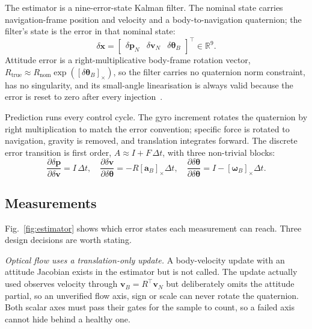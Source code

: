 \documentclass[conference]{IEEEtran}
\begin{document}
The estimator is a nine-error-state Kalman filter. The nominal state carries
navigation-frame position and velocity and a body-to-navigation quaternion;
the filter's state is the error in that nominal state:
\begin{equation}
\delta\mathbf{x} =
\begin{bmatrix} \delta\mathbf{p}_N & \delta\mathbf{v}_N & \delta\boldsymbol{\theta}_B \end{bmatrix}^{\!\top}
\in \mathbb{R}^{9}.
\end{equation}
Attitude error is a right-multiplicative body-frame rotation vector,
$R_{\text{true}} \approx R_{\text{nom}}\exp([\delta\boldsymbol{\theta}_B]_\times)$,
so the filter carries no quaternion norm constraint, has no singularity, and
its small-angle linearisation is always valid because the error is reset to
zero after every injection~\cite{sola2017}.

Prediction runs every control cycle. The gyro increment rotates the quaternion
by right multiplication to match the error convention; specific force is
rotated to navigation, gravity is removed, and translation integrates forward.
The discrete error transition is first order, $A \approx I + F\,\Delta t$, with
three non-trivial blocks:
\begin{equation}
\frac{\partial \delta\mathbf{p}}{\partial \delta\mathbf{v}} = I\,\Delta t,
\quad
\frac{\partial \delta\mathbf{v}}{\partial \delta\boldsymbol{\theta}} = -R[\mathbf{a}_B]_\times \Delta t,
\quad
\frac{\partial \delta\boldsymbol{\theta}}{\partial \delta\boldsymbol{\theta}} = I - [\boldsymbol{\omega}_B]_\times \Delta t.
\end{equation}

\subsection{Measurements}

Fig.~\ref{fig:estimator} shows which error states each measurement can reach.
Three design decisions are worth stating.

\emph{Optical flow uses a translation-only update.} A body-velocity update
with an attitude Jacobian exists in the estimator but is not called. The
update actually used observes velocity through $\mathbf{v}_B = R^\top
\mathbf{v}_N$ but deliberately omits the attitude partial, so an unverified
flow axis, sign or scale can never rotate the quaternion. Both scalar axes
must pass their gates for the sample to count, so a failed axis cannot hide
behind a healthy one.
\end{document}
